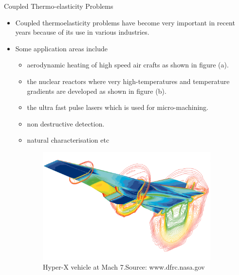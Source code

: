 \documentclass{beamer}
\begin{document}
\begin{frame}[t,fragile]{Coupled Thermo-elasticity Problems}
    \begin{itemize}
        \item Coupled thermoelasticity problems have become very important in recent years because of its use in various industries.
        \item Some application areas include 
            \begin{itemize}
                \item aerodynamic heating of high speed air crafts as shown in figure (a). 
            \item the nuclear reactors where very high-temperatures and temperature gradients are developed as shown in figure (b).
            \item the ultra fast pulse lasers which is used for
micro-machining.
            \item non destructive detection.
            \item natural characterisation etc 
            \end{itemize}
    \end{itemize}
    \vspace{-.5cm}
    \begin{figure}[H]
      \hspace{.5cm}
\begin{subfigure}{0.45\textwidth}
  \vspace{.5cm}
    \centering
 \includegraphics[scale=.1]{hyper.jpg}
 \caption{\tiny{Hyper-X vehicle at Mach 7.Source: www.dfrc.nasa.gov}}
 \end{subfigure}
 \begin{subfigure}{0.45\textwidth}

\end{subfigure}
\end{figure}
\end{frame}
\end{document}
